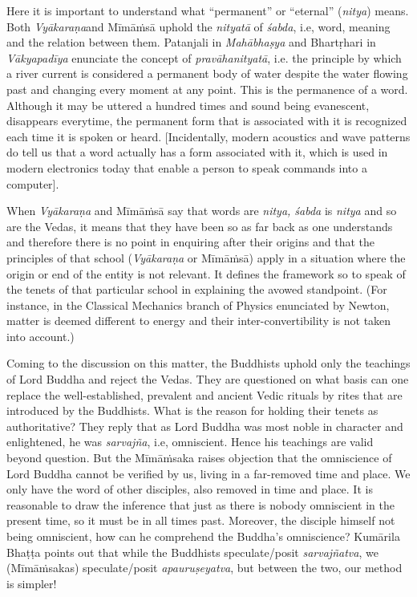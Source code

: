 Here it is important to understand what “permanent” or “eternal” (\textit{nitya}) means. Both \textit{Vyākaraṇa}and Mīmāṁsā uphold the \textit{nityatā} of \textit{śabda}, i.e, word, meaning and the relation between them. Patanjali in \textit{Mahābhaṣya} and Bhartṛhari in \textit{Vākyapadīya} enunciate the concept of \textit{pravāhanityatā}, i.e. the principle by which a river current is considered a permanent body of water despite the water flowing past and changing every moment at any point. This is the permanence of a word. Although it may be uttered a hundred times and sound being evanescent, disappears everytime, the permanent form that is associated with it is recognized each time it is spoken or heard. [Incidentally, modern acoustics and wave patterns do tell us that a word actually has a form associated with it, which is used in modern electronics today that enable a person to speak commands into a computer].

When \textit{Vyākaraṇa} and Mīmāṁsā say that words are \textit{nitya, śabda} is \textit{nitya} and so are the Vedas, it means that they have been so as far back as one understands and therefore there is no point in enquiring after their origins and that the principles of that school (\textit{Vyākaraṇa} or Mīmāṁsā) apply in a situation where the origin or end of the entity is not relevant. It defines the framework so to speak of the tenets of that particular school in explaining the avowed standpoint. (For instance, in the Classical Mechanics branch of Physics enunciated by Newton, matter is deemed different to energy and their inter-convertibility is not taken into account.)

Coming to the discussion on this matter, the Buddhists uphold only the teachings of Lord Buddha and reject the Vedas. They are questioned on what basis can one replace the well-established, prevalent and ancient Vedic rituals by rites that are introduced by the Buddhists. What is the reason for holding their tenets as authoritative? They reply that as Lord Buddha was most noble in character and enlightened, he was \textit{sarvajña}, i.e, omniscient. Hence his teachings are valid beyond question. But the Mīmāṁsaka raises objection that the omniscience of Lord Buddha cannot be verified by us, living in a far-removed time and place. We only have the word of other disciples, also removed in time and place. It is reasonable to draw the inference that just as there is nobody omniscient in the present time, so it must be in all times past. Moreover, the disciple himself not being omniscient, how can he comprehend the Buddha’s omniscience? Kumārila Bhaṭṭa points out that while the Buddhists speculate/posit \textit{sarvajñatva}, we (Mīmāṁsakas) speculate/posit \textit{apauruṣeyatva}, but between the two, our method is simpler!


